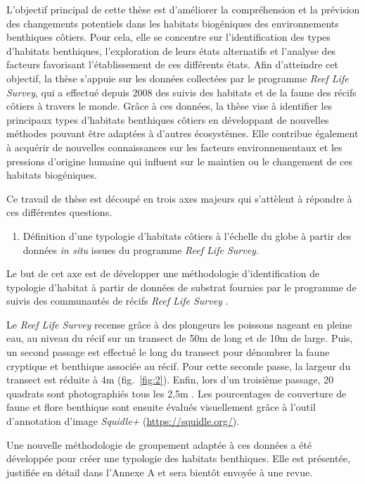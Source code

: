 L'objectif principal de cette thèse est d'améliorer la compréhension et
la prévision des changements potentiels dans les habitats biogéniques
des environnements benthiques côtiers. Pour cela, elle se concentre sur
l'identification des types d'habitats benthiques, l'exploration de leurs
états alternatifs et l'analyse des facteurs favorisant l'établissement
de ces différents états. Afin d'atteindre cet objectif, la thèse
s'appuie sur les données collectées par le programme \emph{Reef Life
Survey}, qui a effectué depuis 2008 des suivis des habitats et de la
faune des récifs côtiers à travers le monde. Grâce à ces données, la
thèse vise à identifier les principaux types d'habitats benthiques
côtiers en développant de nouvelles méthodes pouvant être adaptées à
d'autres écosystèmes. Elle contribue également à acquérir de nouvelles
connaissances sur les facteurs environnementaux et les pressions
d'origine humaine qui influent sur le maintien ou le changement de ces
habitats biogéniques.

Ce travail de thèse est découpé en trois axes majeurs qui s'attèlent à
répondre à ces différentes questions.

\begin{enumerate}
\def\labelenumi{\arabic{enumi}.}
\tightlist
\item
  Définition d'une typologie d'habitats côtiers à l'échelle du globe à
  partir des données \emph{in situ} issues du programme \emph{Reef Life
  Survey}.
\end{enumerate}

Le but de cet axe est de développer une méthodologie d'identification de
typologie d'habitat à partir de données de substrat fournies par le
programme de suivis des communautés de récifs \emph{Reef Life Survey}
\autocite{Edgar_2004}.

Le \emph{Reef Life Survey} recense grâce à des plongeurs les poissons
nageant en pleine eau, au niveau du récif sur un transect de 50m de long
et de 10m de large. Puis, un second passage est effectué le long du
transect pour dénombrer la faune cryptique et benthique associée au
récif. Pour cette seconde passe, la largeur du transect est réduite à 4m
(fig.~\ref{fig:2}). Enfin, lors d'un troisième passage, 20 quadrats sont
photographiés tous les 2,5m \autocite{Edgar_2020}. Les pourcentages de
couverture de faune et flore benthique sont ensuite évalués visuellement
grâce à l'outil d'annotation d'image \emph{Squidle+}
(\url{https://squidle.org/}).

Une nouvelle méthodologie de groupement adaptée à ces données a été
développée pour créer une typologie des habitats benthiques. Elle est
présentée, justifiée en détail dans l'Annexe A et sera bientôt envoyée à
une revue.

